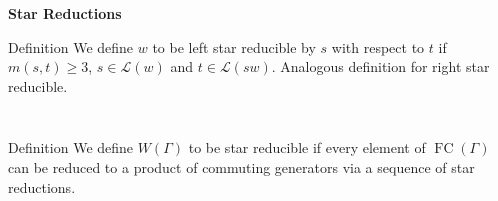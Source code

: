 \documentclass{beamer}
\DeclareMathOperator{\FC}{FC}
\newcommand{\LD}{\mathcal{L}}
\newcommand\heapblock[4]{\fill[fill=#4, fill opacity=0.35, draw=#4, line width=1.1pt, rounded corners,shift={(\xxaxis:#1)},shift={(\yyaxis:#2)}] (-1,-1) rectangle (1,1);\node at (#1,#2) {\footnotesize $#3$};}
\newcommand\dheapblock[4]{\draw[dotted, draw=#4, line width=1.1pt, rounded corners,shift={(\xxaxis:#1)},shift={(\yyaxis:#2)}] (-1,-1) rectangle (1,1);\node at (#1,#2) {\footnotesize $#3$};}
\newcommand\xxaxis{0}
\newcommand\yyaxis{90}
\begin{document}
\begin{frame}{\textbf{Star Reductions}}
\begin{block}{Definition}
	We define $w$ to be \alert{left star reducible by $s$ with respect to $t$} if $m(s,t) \geq 3$, $s \in \LD(w)$ and $ t \in \LD(sw)$. Analogous definition for \alert{right star reducible}.
\end{block}

\pause

\vspace{-1em}

\begin{columns}
\begin{column}{0.4\textwidth}
\begin{figure} \centering
{}
\end{figure}	
\end{column}
	
\begin{column}{0.4\textwidth}	
\begin{figure}
\end{figure}
\end{column}
\end{columns}

\pause

\begin{block}{Definition}
	We define $W(\Gamma)$ to be \alert{star reducible} if every element of $\FC(\Gamma)$ can be reduced to a product of commuting generators via a sequence of star reductions.
\end{block}

\end{frame}
\end{document}
